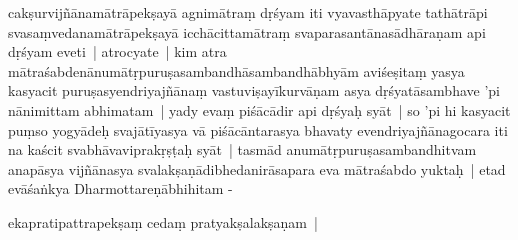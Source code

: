 \documentclass[article,12pt,a4paper]{memoir}%
\newcounter{parCount}
\begin{document}
cakṣurvijñānamātrāpekṣayā agnimātraṃ dṛśyam iti vyavasthāpyate tathātrāpi svasaṃvedanamātrāpekṣayā icchācittamātraṃ svaparasantānasādhāraṇam api dṛśyam eveti | \label{thakur75-146.16} atrocyate | kim atra mātraśabdenānumātṛpuruṣasambandhāsambandhābhyām aviśeṣitaṃ yasya kasyacit puruṣasyendriyajñānaṃ vastuviṣayīkurvāṇam asya dṛśyatāsambhave 'pi nānimittam abhimatam | yady evaṃ piśācādir api dṛśyaḥ syāt | so 'pi hi kasyacit puṃso yogyādeḥ svajātīyasya vā piśācāntarasya bhavaty evendriyajñānagocara iti na kaścit svabhāvaviprakṛṣṭaḥ syāt | tasmād anumātṛpuruṣasambandhitvam anapāsya vijñānasya svalakṣaṇādibhedanirāsapara eva mātraśabdo yuktaḥ | etad evāśaṅkya Dharmottareṇābhihitam -
	{}
	\pend%
      

	  
	  \pstart \leavevmode%
	ekapratipattrapekṣaṃ cedaṃ pratyakṣalakṣaṇam | 
	{}
	\pend%
      
\end{document}

